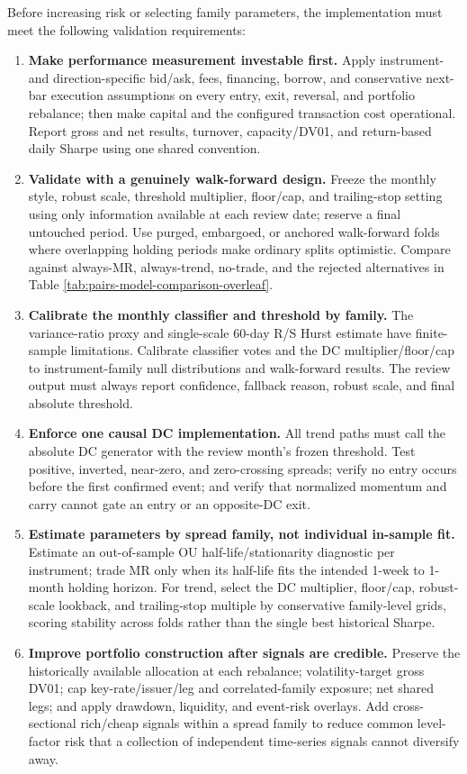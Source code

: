 Before increasing risk or selecting family parameters, the implementation must meet
the following validation requirements:

\begin{enumerate}
\item \textbf{Make performance measurement investable first.} Apply instrument- and
direction-specific bid/ask, fees, financing, borrow, and conservative next-bar
execution assumptions on every entry, exit, reversal, and portfolio rebalance;
then make capital and the configured transaction cost operational. Report gross
and net results, turnover, capacity/DV01, and return-based daily Sharpe using one
shared convention.

\item \textbf{Validate with a genuinely walk-forward design.} Freeze the monthly style,
robust scale, threshold multiplier, floor/cap, and trailing-stop setting using only
information available at each review date; reserve a final untouched period. Use
purged, embargoed, or anchored walk-forward folds where overlapping holding periods
make ordinary splits optimistic. Compare against always-MR, always-trend, no-trade,
and the rejected alternatives in Table \ref{tab:pairs-model-comparison-overleaf}.

\item \textbf{Calibrate the monthly classifier and threshold by family.} The
variance-ratio proxy and single-scale 60-day R/S Hurst estimate have finite-sample
limitations. Calibrate classifier votes and the DC multiplier/floor/cap to
instrument-family null distributions and walk-forward results. The review output
must always report confidence, fallback reason, robust scale, and final absolute
threshold.

\item \textbf{Enforce one causal DC implementation.} All trend paths must call the
absolute DC generator with the review month's frozen threshold. Test positive,
inverted, near-zero, and zero-crossing spreads; verify no entry occurs before the
first confirmed event; and verify that normalized momentum and carry cannot gate an
entry or an opposite-DC exit.

\item \textbf{Estimate parameters by spread family, not individual in-sample fit.}
Estimate an out-of-sample OU half-life/stationarity diagnostic per instrument; trade
MR only when its half-life fits the intended 1-week to 1-month holding horizon. For
trend, select the DC multiplier, floor/cap, robust-scale lookback, and trailing-stop
multiple by conservative family-level grids, scoring stability across folds rather
than the single best historical Sharpe.

\item \textbf{Improve portfolio construction after signals are credible.} Preserve the
historically available allocation at each rebalance; volatility-target gross DV01;
cap key-rate/issuer/leg and correlated-family exposure; net shared legs; and apply
drawdown, liquidity, and event-risk overlays. Add cross-sectional rich/cheap
signals within a spread family to reduce common level-factor risk that a collection
of independent time-series signals cannot diversify away.
\end{enumerate}
